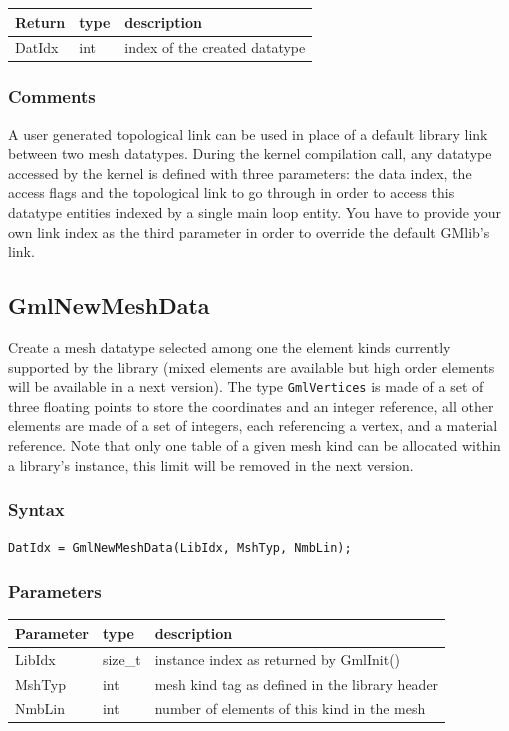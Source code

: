 \documentclass[a4paper,12pt]{article}
\begin{document}
\medskip

\begin{tabular}{|m{2cm}|m{1.5cm}|m{10.5cm}|}
\hline
Return     & type   & description \\
\hline
DatIdx     & int    & index of the created datatype \\
\hline
\end{tabular}

\subsubsection*{Comments}
A user generated topological link can be used in place of a default library link between two mesh datatypes. During the kernel compilation call, any datatype accessed by the kernel is defined with three parameters: the data index, the access flags and the topological link to go through in order to access this datatype entities indexed by a single main loop entity. You have to provide your own link index as the third parameter in order to override the default GMlib's link.


\subsection{GmlNewMeshData}
Create a mesh datatype selected among one the element kinds currently supported by the library (mixed elements are available but high order elements will be available in a next version). The type {\tt GmlVertices} is made of a set of three floating points to store the coordinates and an integer reference, all other elements are made of a set of integers, each referencing a vertex, and a material reference. Note that only one table of a given mesh kind can be allocated within a library's instance, this limit will be removed in the next version.

\subsubsection*{Syntax}
{\tt DatIdx = GmlNewMeshData(LibIdx, MshTyp, NmbLin);}

\subsubsection*{Parameters}
\begin{tabular}{|m{2cm}|m{1.5cm}|m{10.5cm}|}
\hline
Parameter  & type    & description \\
\hline
LibIdx     & size\_t & instance index as returned by GmlInit() \\
\hline
MshTyp     & int     & mesh kind tag as defined in the library header \\
\hline
NmbLin     & int     & number of elements of this kind in the mesh \\
\hline
\end{tabular}
\end{document}
